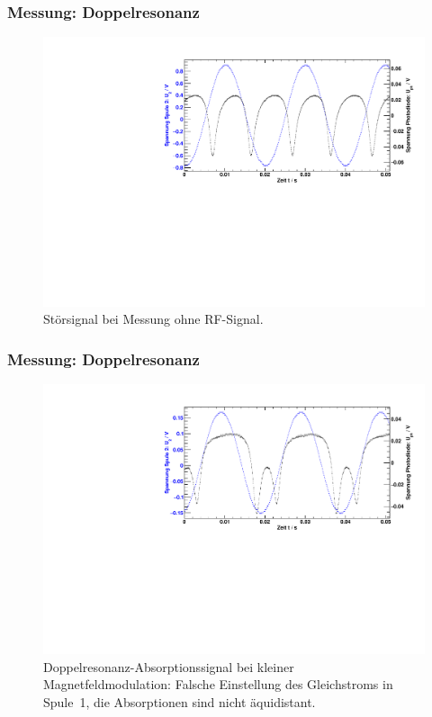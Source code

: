 \begin{frame}
\frametitle{Messung: Doppelresonanz}
\begin{figure}
    \begin{center}
        \includegraphics[width=\textwidth]{../img/07.pdf}
        \caption{Störsignal bei Messung ohne RF-Signal.}
        \label{img:dehmelt}
    \end{center}
\end{figure}
\end{frame}


\begin{frame}
\frametitle{Messung: Doppelresonanz}
\begin{figure}
    \begin{center}
        \includegraphics[width=\textwidth]{../img/11.pdf}
        \caption{Doppelresonanz-Absorptionssignal bei kleiner Magnetfeldmodulation:
        Falsche Einstellung des Gleichstroms in Spule~1,
        die Absorptionen sind nicht äquidistant.}
        \label{img:rfwrong}
    \end{center}
\end{figure}
\end{frame}


